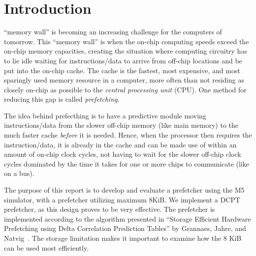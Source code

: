 \section{Introduction}

 ``memory wall'' is becoming an increasing challenge for the
computers of tomorrow. This ``memory wall'' is when the on-chip computing speeds
exceed the on-chip memory capacities, creating the situation where computing
circuitry has to lie idle waiting for instructions/data to arrive from off-chip
locations and be put into the on-chip cache. The cache is the fastest, most
expensive, and most sparingly used memory resource in a computer, more often
than not residing as closely on-chip as possible to the \emph{central processing
unit} (CPU). One method for reducing this gap is called \emph{prefetching}.

The idea behind prefecthing is to have a predictive module moving
instructions/data from the slower off-chip memory (like main memory) to the much
faster cache \emph{before} it is needed. Hence, when the processor then requires
the instruction/data, it is already in the cache and can be made use of within
an amount of on-chip clock cycles, not having to wait for the slower off-chip
clock cycles dominated by the time it takes for one or more chips to communicate
(like on a bus).

The purpose of this report is to develop and evaluate a prefetcher using the M5
simulator, with a prefetcher utilizing maximum 8KiB. We implement a DCPT
prefetcher, as this design proves to be very effective. The prefetcher is
implemented according to the algorithm presented in ``Storage Efficient Hardware
Prefetching using Delta Correlation Prediction Tables'' by Grannaes, Jahre, and
Natvig~\cite{dcpt}. The storage limitation makes it important to examine how the
8 KiB can be used most efficiently. 

